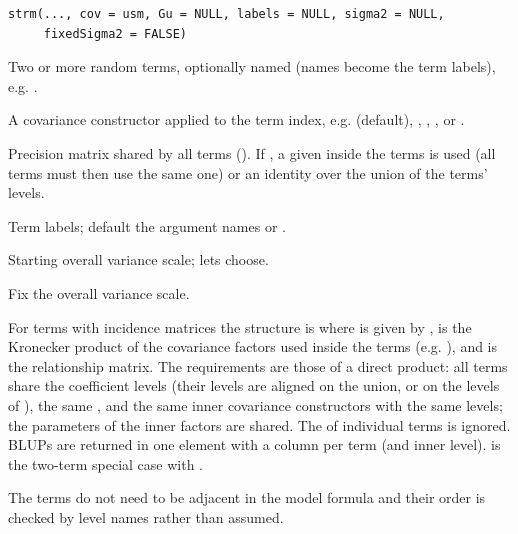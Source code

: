 \documentclass[a4paper]{book}
\begin{document}
%
\begin{Usage}
\begin{verbatim}
strm(..., cov = usm, Gu = NULL, labels = NULL, sigma2 = NULL,
     fixedSigma2 = FALSE)
\end{verbatim}
\end{Usage}
%
\begin{Arguments}
\begin{ldescription}
\item[\code{...}] Two or more random  terms, optionally named (names
become the term labels), e.g. .
\item[\code{cov}] A covariance constructor applied to the term index, e.g.
 (default), , , , or
.
\item[\code{Gu}] Precision matrix shared by all terms ().
If , a  given inside the terms is used (all terms must
then use the same one) or an identity over the union of the terms' levels.
\item[\code{labels}] Term labels; default the argument names or .
\item[\code{sigma2}] Starting overall variance scale;  lets  choose.
\item[\code{fixedSigma2}] Fix the overall variance scale.
\end{ldescription}
\end{Arguments}
%
\begin{Details}\relax
For terms  with incidence matrices 
the structure is
where  is given by ,  is the Kronecker
product of the covariance factors used inside the terms (e.g.
), and  is the relationship matrix. The requirements are
those of a direct product: all terms share the
coefficient levels (their levels are aligned on the union, or on the levels of
), the same , and the same inner covariance constructors with
the same levels; the parameters of the inner factors are shared. The
 of individual terms is ignored. BLUPs are returned in one
 element with a column per term (and inner level).
 is the two-term special case with .

The terms do not need to be adjacent in the model
formula and their order is checked by level names rather than assumed.
\end{Details}
\end{document}
